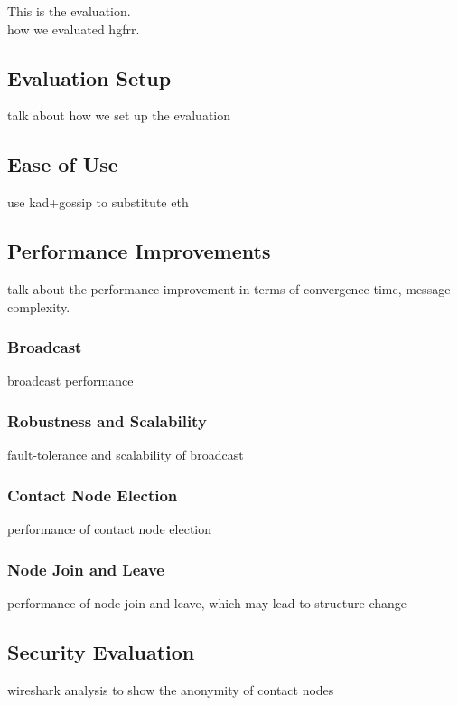 This is the evaluation. \\

how we evaluated hgfrr.

\subsection{Evaluation Setup}

talk about how we set up the evaluation

\subsection{Ease of Use}

use kad+gossip to substitute eth

\subsection{Performance Improvements}

talk about the performance improvement in terms of convergence time, message complexity.

\subsubsection{Broadcast}

broadcast performance

\subsubsection{Robustness and Scalability}

fault-tolerance and scalability of broadcast

\subsubsection{Contact Node Election}

performance of contact node election

\subsubsection{Node Join and Leave}

performance of node join and leave, which may lead to structure change

\subsection{Security Evaluation}

wireshark analysis to show the anonymity of contact nodes